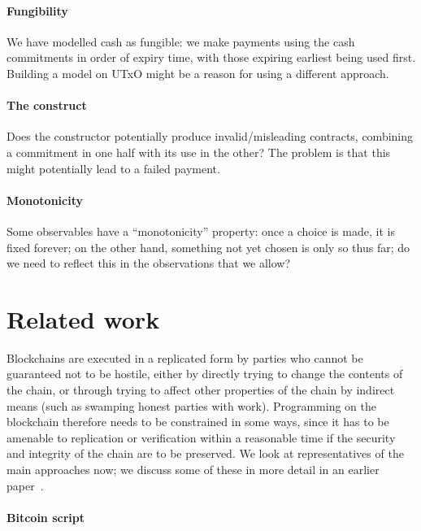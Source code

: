 \documentclass[runningheads]{llncs}
\begin{document}
{\paragraph{Fungibility}

We have modelled cash as fungible: we make payments using the cash commitments in order of expiry time, with those 
expiring earliest being used first. Building a model on UTxO might be a reason for using a different approach.


\paragraph{The  construct}

Does the  constructor potentially produce invalid/misleading contracts, combining a commitment in 
one half with its use in the other? The problem is that this might potentially lead to 
a failed payment. 

\paragraph{Monotonicity}

Some observables have a ``monotonicity'' property: once a choice is made, it is fixed forever; on the other hand, 
something not yet chosen is only so thus far; do we need to reflect this in the observations that we allow?

} %

\section{Related work}
\label{sec:related}

Blockchains are executed in a replicated form by parties who cannot be guaranteed not to be hostile, either by directly 
trying to change the contents of the chain, or through trying to affect other properties of the chain by indirect means 
(such as swamping honest parties with work). Programming on the blockchain therefore needs to be constrained in some 
ways, since it has to be amenable to replication or verification within a reasonable time if the security and integrity 
of the chain are to be preserved. We look at representatives of the main approaches now; we discuss some of these in more detail in an earlier paper~\cite{cryptoeprint:2016:1156}.

\paragraph{Bitcoin script}
\end{document}
